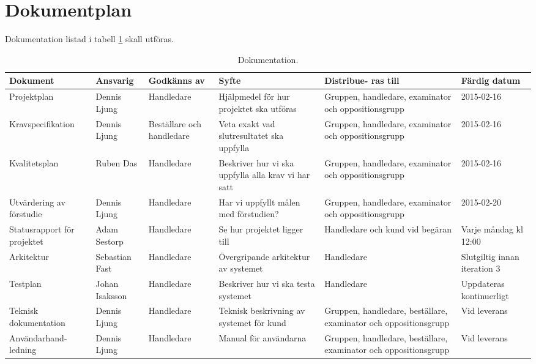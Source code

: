 \section{Dokumentplan}
Dokumentation listad i tabell \ref{dokumentation:tabell} skall utföras.

\begin{table}[H]
	\centering
		\begin{tabularx}{\textwidth}{| p{20mm} | l | X | p{20mm} | X | X |}
			\hline
			\textbf{Dokument} & \textbf{Ansvarig} & \textbf{Godkänns av} & \textbf{Syfte} & \textbf{Distribue-
  ras till} & \textbf{Färdig datum} \\\hline

    		
			{Projektplan} & {Dennis Ljung} & {Handledare} & {Hjälpmedel för hur projektet ska utföras} & {Gruppen, handledare, examinator och oppositionsgrupp} & {2015-02-16} \\\hline
			
			{Kravspecifikation} & {Dennis Ljung} & {Beställare och handledare} & {Veta exakt vad slutresultatet ska uppfylla} & {Gruppen, handledare, examinator och oppositionsgrupp} & {2015-02-16} \\\hline
			
			{Kvalitetsplan} & {Ruben Das} & {Handledare} & {Beskriver hur vi ska uppfylla alla krav vi har satt} & {Gruppen, handledare, examinator och oppositionsgrupp} & {2015-02-16} \\\hline
			
						{Utvärdering av förstudie} & {Dennis Ljung} & {Handledare} & {Har vi uppfyllt målen med förstudien?} & {Gruppen, handledare, examinator och oppositionsgrupp} & {2015-02-20} \\\hline
			
			{Statusrapport för projektet} & {Adam Sestorp} & {Handledare} & {Se hur projektet ligger till} & {Handledare och kund vid begäran} & {Varje måndag kl 12:00} \\\hline
			
            {Arkitektur} & {Sebastian Fast} & {Handledare} & {Övergripande arkitektur av systemet} & {Handledare} & {Slutgiltig innan iteration 3} \\\hline
               {Testplan} & {Johan Isaksson} & {Handledare} & {Beskriver hur vi ska testa systemet} & {Handledare} & {Uppdateras kontinuerligt} \\\hline

          {Teknisk dokumentation} & {Dennis Ljung} & {Handledare} & {Teknisk beskrivning av systemet för kund} & {Gruppen, handledare, beställare, examinator och oppositionsgrupp} & {Vid leverans} \\\hline			
			
            {Användarhand-ledning} & {Dennis Ljung} & {Handledare} & {Manual för användarna} & {Gruppen, handledare, beställare, examinator och oppositionsgrupp} & {Vid leverans} \\\hline
            
			
			
		\end{tabularx}
	\caption{Dokumentation.} \label{dokumentation:tabell}
\end{table}
